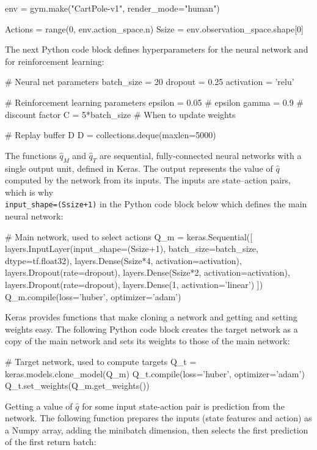 \begin{withcode}
\begin{pythoncode}
env = gym.make("CartPole-v1", render_mode="human")

Actions = range(0, env.action_space.n)
Ssize = env.observation_space.shape[0]
\end{pythoncode}

The next Python code block defines hyperparameters for the neural network and for reinforcement learning:

\begin{pythoncode}
# Neural net parameters
batch_size = 20
dropout = 0.25
activation = 'relu'

# Reinforcement learning parameters
epsilon = 0.05 # epsilon
gamma = 0.9 # discount factor
C = 5*batch_size # When to update weights

# Replay buffer D
D = collections.deque(maxlen=5000)
\end{pythoncode}

The functions $\hat{q}_M$ and $\hat{q}_T$ are sequential, fully-connected neural networks with a single output unit, defined in Keras. The output represents the value of $\hat{q}$ computed by the network from its inputs. The inputs are state--action pairs, which is why \\
{\small \texttt{input\_shape=(Ssize+1)}} in the Python code block below which defines the main neural network:

\begin{pythoncode}
# Main network, used to select actions
Q_m = keras.Sequential([
    layers.InputLayer(input_shape=(Ssize+1),
                      batch_size=batch_size,
                      dtype=tf.float32),
    layers.Dense(Ssize*4, activation=activation),
    layers.Dropout(rate=dropout),
    layers.Dense(Ssize*2, activation=activation),
    layers.Dropout(rate=dropout),
    layers.Dense(1, activation='linear')
])
Q_m.compile(loss='huber', optimizer='adam')
\end{pythoncode}

Keras provides functions that make cloning a network and getting and setting weights easy. The following Python code block creates the target network as a copy of the main network and sets its weights to those of the main network:

\begin{pythoncode}
# Target network, used to compute targets
Q_t = keras.models.clone_model(Q_m)
Q_t.compile(loss='huber', optimizer='adam')
Q_t.set_weights(Q_m.get_weights())
\end{pythoncode}

Getting a value of $\hat{q}$ for some input state-action pair is prediction from the network. The following function prepares the inputs (state features and action) as a Numpy array, adding the minibatch dimension, then selects the first prediction of the first return batch:


\end{withcode}
